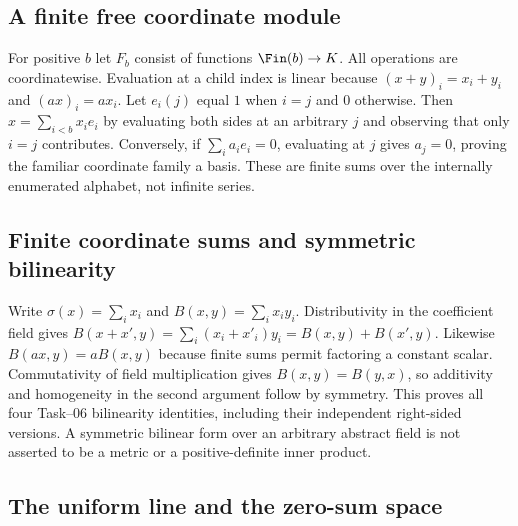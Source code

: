 \subsection{A finite free coordinate module}\label{supp:8-1}
\par{}\par\smallskip

For positive $b$ let $F_b$ consist of functions $\Fin(b)\to K$. All operations are coordinatewise. Evaluation at a child index is linear because $(x+y)_i=x_i+y_i$ and $(ax)_i=ax_i$. Let $e_i(j)$ equal $1$ when $i=j$ and $0$ otherwise. Then $x=\sum_{i<b}x_ie_i$ by evaluating both sides at an arbitrary $j$ and observing that only $i=j$ contributes. Conversely, if $\sum_i a_ie_i=0$, evaluating at $j$ gives $a_j=0$, proving the familiar coordinate family a basis. These are finite sums over the internally enumerated alphabet, not infinite series.

\subsection{Finite coordinate sums and symmetric bilinearity}\label{supp:8-2}
\par{}\par\smallskip

Write $\sigma(x)=\sum_i x_i$ and $B(x,y)=\sum_i x_iy_i$. Distributivity in the coefficient field gives $B(x+x',y)=\sum_i(x_i+x'_i)y_i=B(x,y)+B(x',y)$. Likewise $B(ax,y)=aB(x,y)$ because finite sums permit factoring a constant scalar. Commutativity of field multiplication gives $B(x,y)=B(y,x)$, so additivity and homogeneity in the second argument follow by symmetry. This proves all four Task--06 bilinearity identities, including their independent right-sided versions. A symmetric bilinear form over an arbitrary abstract field is not asserted to be a metric or a positive-definite inner product.

\subsection{The uniform line and the zero-sum space}\label{supp:8-3}
\par{}\par\smallskip

